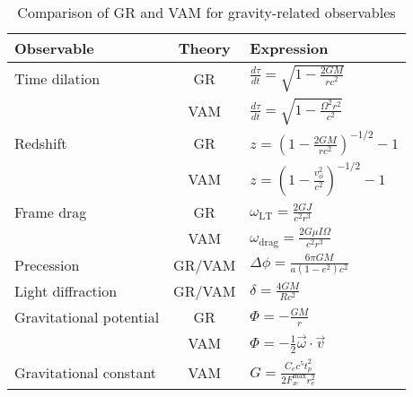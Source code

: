\begin{table}[ht]
    \centering
    \caption{Comparison of GR and VAM for gravity-related observables}
    \label{tab:VAM-GR}
    \begin{tabular}{|l|c|l|}
        \hline
        \textbf{Observable} & \textbf{Theory} & \textbf{Expression} \\
        \hline
        Time dilation & GR & $ \frac{d\tau}{dt} = \sqrt{1 - \frac{2GM}{rc^2}} $ \\
        & VAM & $ \frac{d\tau}{dt} = \sqrt{1 - \frac{\Omega^2 r^2}{c^2}} $ \\
        \hline
        Redshift & GR & $ z = \left(1 - \frac{2GM}{rc^2} \right)^{-1/2} - 1 $ \\
        & VAM & $ z = \left(1 - \frac{v_\phi^2}{c^2} \right)^{-1/2} - 1 $ \\
        \hline
        Frame drag & GR & $ \omega_\text{LT} = \frac{2GJ}{c^2 r^3} $ \\
        & VAM & $ \omega_\text{drag} = \frac{2G \mu I \Omega}{c^2 r^3} $ \\
        \hline
        Precession & GR/VAM & $ \Delta\phi = \frac{6\pi GM}{a(1 - e^2)c^2} $ \\
        \hline
        Light diffraction & GR/VAM & $ \delta = \frac{4GM}{Rc^2} $ \\
        \hline
        Gravitational potential & GR & $ \Phi = -\frac{GM}{r} $ \\
        & VAM & $ \Phi = -\frac{1}{2} \vec{\omega} \cdot \vec{v} $ \\
        \hline
        Gravitational constant & VAM & $ G = \frac{C_e c^5 t_p^2}{2 F^{\text{max}}_{\text{\ae}} r_c^2} $ \\
        \hline
    \end{tabular}
\end{table}

